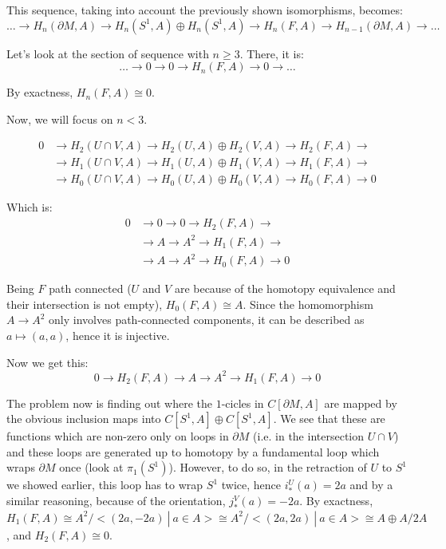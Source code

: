 \documentclass{article}
\begin{document}
This sequence, taking into account the previously shown isomorphisms, becomes:
$$\ldots\rightarrow H_n(\partial M,A)\rightarrow H_n(S^1,A)\oplus H_n(S^1,A)\rightarrow H_n(F,A)\rightarrow H_{n-1}(\partial M,A)\rightarrow\ldots$$

Let's look at the section of sequence with $n\geq 3$. There, it is:
$$\ldots\rightarrow 0\rightarrow 0\rightarrow H_n(F,A)\rightarrow 0\rightarrow\ldots$$

By exactness, $H_n(F,A)\cong 0$.

Now, we will focus on $n<3$.

\begin{align*}
		0 &\rightarrow H_2(U\cap V,A)\rightarrow H_2(U,A)\oplus H_2(V,A)\rightarrow H_2(F,A)\rightarrow \\
		& \rightarrow H_1(U\cap V,A)\rightarrow H_1(U,A)\oplus H_1(V,A)\rightarrow H_1(F,A)\rightarrow \\
		& \rightarrow H_0(U\cap V,A)\rightarrow H_0(U,A)\oplus H_0(V,A)\rightarrow H_0(F,A)\rightarrow 0
\end{align*}

Which is:
\begin{align*}
		0 &\rightarrow 0\rightarrow 0\rightarrow H_2(F,A)\rightarrow \\
		& \rightarrow A\rightarrow A^2\rightarrow H_1(F,A)\rightarrow \\
		& \rightarrow A\rightarrow A^2\rightarrow H_0(F,A)\rightarrow 0
\end{align*}

Being $F$ path connected ($U$ and $V$ are because of the homotopy equivalence and their intersection is not empty), $H_0(F,A)\cong A$. Since the homomorphism $A\rightarrow A^2$ only involves path-connected components, it can be described as $a\mapsto (a,a)$, hence it is injective.

Now we get this:$$0\rightarrow H_2(F,A)\rightarrow A\rightarrow A^2\rightarrow H_1(F,A)\rightarrow 0$$

The problem now is finding out where the $1$-cicles in $C[\partial M,A]$ are mapped by the obvious inclusion maps into $C[S^1,A]\oplus C[S^1,A]$. We see that these are functions which are non-zero only on loops in $\partial M$ (i.e. in the intersection $U\cap V$) and these loops are generated up to homotopy by a fundamental loop which wraps $\partial M$ once (look at $\pi_1(S^1)$). However, to do so, in the retraction of $U$ to $S^1$ we showed earlier, this loop has to wrap $S^1$ twice, hence $i_*^U(a)=2a$ and by a similar reasoning, because of the orientation, $j_*^V(a)=-2a$. By exactness, $H_1(F,A)\cong A^2/<(2a,-2a)\ |\ a\in A>\cong A^2/<(2a,2a)\ |\ a\in A>\cong A\oplus A/2A$, and $H_2(F,A)\cong 0$.
\end{document}
